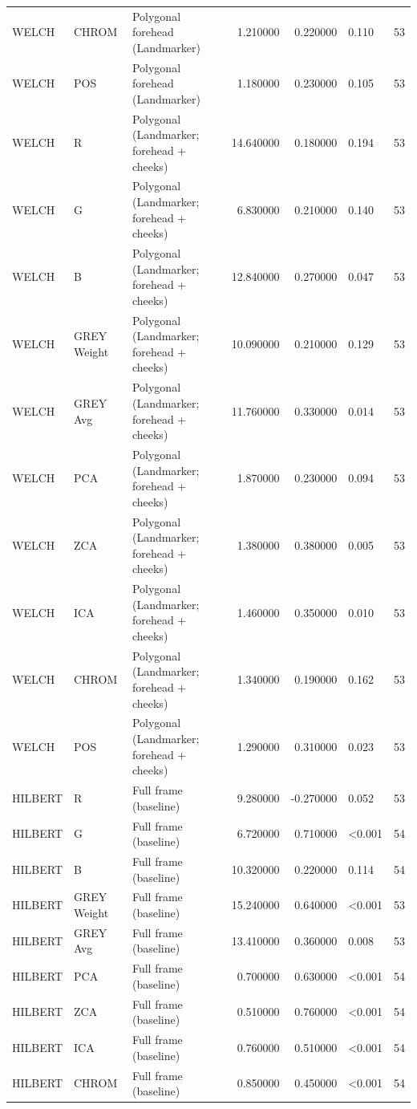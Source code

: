 \begin{table}[htbp]
\begin{tabular}{l l l r r l r}
WELCH & CHROM & Polygonal forehead (Landmarker) & 1.210000 & 0.220000 & 0.110 & 53 \\
WELCH & POS & Polygonal forehead (Landmarker) & 1.180000 & 0.230000 & 0.105 & 53 \\
WELCH & R & Polygonal (Landmarker; forehead + cheeks) & 14.640000 & 0.180000 & 0.194 & 53 \\
WELCH & G & Polygonal (Landmarker; forehead + cheeks) & 6.830000 & 0.210000 & 0.140 & 53 \\
WELCH & B & Polygonal (Landmarker; forehead + cheeks) & 12.840000 & 0.270000 & 0.047 & 53 \\
WELCH & GREY Weight & Polygonal (Landmarker; forehead + cheeks) & 10.090000 & 0.210000 & 0.129 & 53 \\
WELCH & GREY Avg & Polygonal (Landmarker; forehead + cheeks) & 11.760000 & 0.330000 & 0.014 & 53 \\
WELCH & PCA & Polygonal (Landmarker; forehead + cheeks) & 1.870000 & 0.230000 & 0.094 & 53 \\
WELCH & ZCA & Polygonal (Landmarker; forehead + cheeks) & 1.380000 & 0.380000 & 0.005 & 53 \\
WELCH & ICA & Polygonal (Landmarker; forehead + cheeks) & 1.460000 & 0.350000 & 0.010 & 53 \\
WELCH & CHROM & Polygonal (Landmarker; forehead + cheeks) & 1.340000 & 0.190000 & 0.162 & 53 \\
WELCH & POS & Polygonal (Landmarker; forehead + cheeks) & 1.290000 & 0.310000 & 0.023 & 53 \\
HILBERT & R & Full frame (baseline) & 9.280000 & -0.270000 & 0.052 & 53 \\
HILBERT & G & Full frame (baseline) & 6.720000 & 0.710000 & <0.001 & 54 \\
HILBERT & B & Full frame (baseline) & 10.320000 & 0.220000 & 0.114 & 54 \\
HILBERT & GREY Weight & Full frame (baseline) & 15.240000 & 0.640000 & <0.001 & 53 \\
HILBERT & GREY Avg & Full frame (baseline) & 13.410000 & 0.360000 & 0.008 & 53 \\
HILBERT & PCA & Full frame (baseline) & 0.700000 & 0.630000 & <0.001 & 54 \\
HILBERT & ZCA & Full frame (baseline) & 0.510000 & 0.760000 & <0.001 & 54 \\
HILBERT & ICA & Full frame (baseline) & 0.760000 & 0.510000 & <0.001 & 54 \\
HILBERT & CHROM & Full frame (baseline) & 0.850000 & 0.450000 & <0.001 & 54 \\

\end{tabular}
\end{table}
